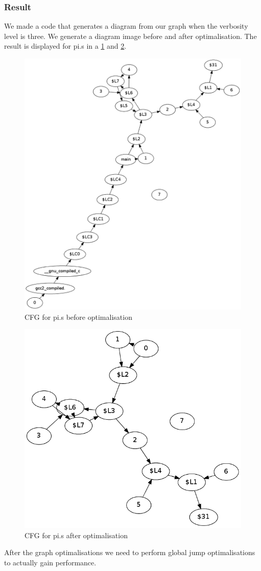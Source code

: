 \subsubsection{Result}
We made a code that generates a diagram from our graph when the verbosity level
is three. We generate a diagram image before and 
after optimalisation. The result is displayed for pi.s in a \ref{fig:before} 
and \ref{fig:after}.
\begin{figure}[H]
\centering
\includegraphics[scale=0.2]{images/before}
\caption{CFG for pi.s before optimalisation}
\label{fig:before}
\end{figure}
\begin{figure}[H]
\centering
\includegraphics[scale=0.2]{images/after}
\caption{CFG for pi.s after optimalisation}
\label{fig:after}
\end{figure}
After the graph optimalisations we need to perform global jump optimalisations
to actually gain performance.

